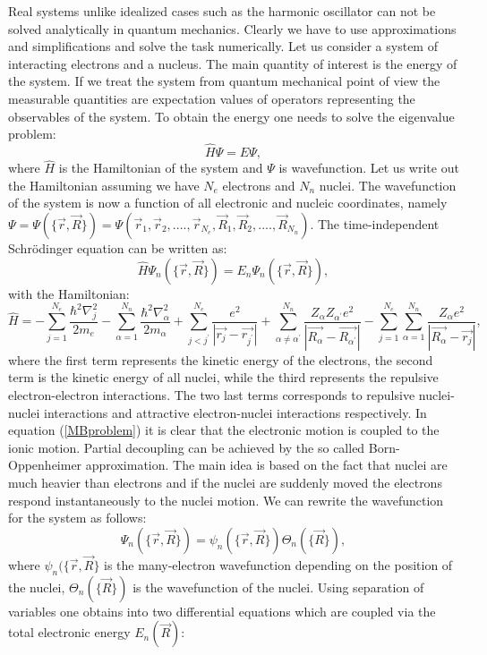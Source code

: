 \documentclass[twoside,english]{uiofysmaster}
\begin{document}
Real systems unlike idealized cases such as the harmonic oscillator can not be solved analytically in quantum mechanics.
Clearly we have to use approximations and simplifications and solve the task numerically.
Let us consider a system of interacting electrons and a nucleus. The main quantity of interest is the energy of the system. If we treat the system from quantum mechanical point of view the measurable quantities are expectation values of operators representing the observables of the system.
To obtain the energy one needs to solve the eigenvalue problem:
\[
\hat{H}\Psi = E\Psi,
\]
where $\hat{H}$ is the Hamiltonian of the system and $\Psi$ is wavefunction.
Let us write out the Hamiltonian assuming we have $N_e$ electrons and $N_n$ nuclei. The wavefunction of the system is now a function of all electronic and nucleic coordinates, namely $\Psi=\Psi(\{\vec{r}, \vec{R}\}) = \Psi(\vec{r}_1, \vec{r}_2, ...., \vec{r}_{N_e}, \vec{R}_1, \vec{R}_2, ...., \vec{R}_{N_n})$. The time-independent Schr\"{o}dinger equation can be written as:
\begin{equation}\label{MBproblem}
\hat{H}\Psi_n(\{\vec{r}, \vec{R}\}) = E_n\Psi_n(\{\vec{r}, \vec{R}\}),
\end{equation}
with the Hamiltonian:
\[
\hat{H} = -\sum_{j=1}^{N_e} \frac{\hbar^2\nabla_j^2}{2m_e} -\sum_{\alpha=1}^{N_n} \frac{\hbar^2\nabla_{\alpha}^2}{2m_\alpha} +
\sum_{j<j^{\prime}}^{N_e} \frac{e^2}{|\vec{r_j} - \vec{r_{j^{\prime}}}|} + \sum_{\alpha\neq \alpha^{\prime}}^{N_n} \frac{Z_{\alpha}Z_{\alpha^{\prime}}e^2}{|\vec{R_{\alpha}} - \vec{R_{\alpha^{\prime}}}|} - \sum_{j=1}^{N_e} \sum_{\alpha=1}^{N_n} \frac{Z_{\alpha}e^2}{|\vec{R_{\alpha}} - \vec{r_j}|},
\]
where the first term represents the kinetic energy of the electrons, the second term is the kinetic energy of all nuclei, while the third represents the repulsive electron-electron interactions. The two last terms corresponds to repulsive nuclei-nuclei interactions and attractive electron-nuclei interactions respectively. %
In equation (\ref{MBproblem}) it is clear that the electronic motion is coupled to the ionic motion.
Partial decoupling can be achieved by the so called Born-Oppenheimer approximation. The main idea is based on the fact that nuclei are much heavier than electrons and if the nuclei are suddenly moved the electrons respond instantaneously to the nuclei motion. We can rewrite the wavefunction for the system as follows:
\[
\Psi_n(\{\vec{r}, \vec{R}\}) = \psi_n(\{\vec{r}, \vec{R}\})\Theta_n(\{\vec{R}\}),
\]
where $\psi_n(\{\vec{r}, \vec{R}\}$ is the many-electron wavefunction depending on the position of the nuclei, $\Theta_n(\{\vec{R}\})$ is the wavefunction of the nuclei.
Using separation of variables one obtains into two differential equations which are coupled via the total electronic energy $E_n(\vec{R})$:
\end{document}
